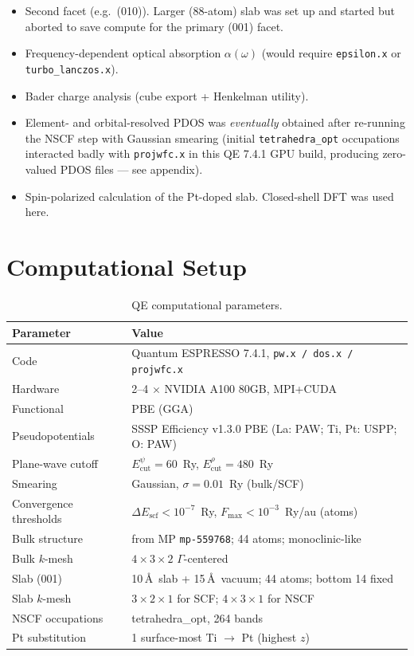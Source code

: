 \documentclass[11pt]{article}
\begin{document}
\begin{itemize}[leftmargin=*]
    \item Second facet (e.g.\ (010)). Larger (88-atom) slab was set up and started but aborted to save compute for the primary (001) facet.
    \item Frequency-dependent optical absorption $\alpha(\omega)$ (would require \texttt{epsilon.x} or \texttt{turbo\_lanczos.x}).
    \item Bader charge analysis (cube export + Henkelman utility).
    \item Element- and orbital-resolved PDOS was \emph{eventually} obtained after re-running the NSCF step with Gaussian smearing (initial \texttt{tetrahedra\_opt} occupations interacted badly with \texttt{projwfc.x} in this QE 7.4.1 GPU build, producing zero-valued PDOS files --- see appendix).
    \item Spin-polarized calculation of the Pt-doped slab. Closed-shell DFT was used here.
\end{itemize}

\section{Computational Setup}

\begin{table}[H]
\centering
\caption{QE computational parameters.}
\begin{tabular}{ll}
\toprule
Parameter & Value \\
\midrule
Code & Quantum ESPRESSO 7.4.1, \texttt{pw.x / dos.x / projwfc.x} \\
Hardware & 2--4 $\times$ NVIDIA A100 80GB, MPI+CUDA \\
Functional & PBE (GGA) \\
Pseudopotentials & SSSP Efficiency v1.3.0 PBE (La: PAW; Ti, Pt: USPP; O: PAW)\\
Plane-wave cutoff & $E_\text{cut}^{\psi}=60$~Ry, $E_\text{cut}^{\rho}=480$~Ry \\
Smearing & Gaussian, $\sigma = 0.01$~Ry (bulk/SCF) \\
Convergence thresholds & $\Delta E_\text{scf} < 10^{-7}$~Ry, $F_{\max} < 10^{-3}$~Ry/au (atoms) \\
Bulk structure & from MP \texttt{mp-559768}; 44 atoms; monoclinic-like \\
Bulk $k$-mesh & $4\times3\times2$ $\Gamma$-centered \\
Slab (001) & 10\,\AA\ slab + 15\,\AA\ vacuum; 44 atoms; bottom 14 fixed \\
Slab $k$-mesh & $3\times2\times1$ for SCF; $4\times3\times1$ for NSCF \\
NSCF occupations & tetrahedra\_opt, 264 bands \\
Pt substitution & 1 surface-most Ti $\to$ Pt (highest $z$) \\
\bottomrule
\end{tabular}
\end{table}
\end{document}
